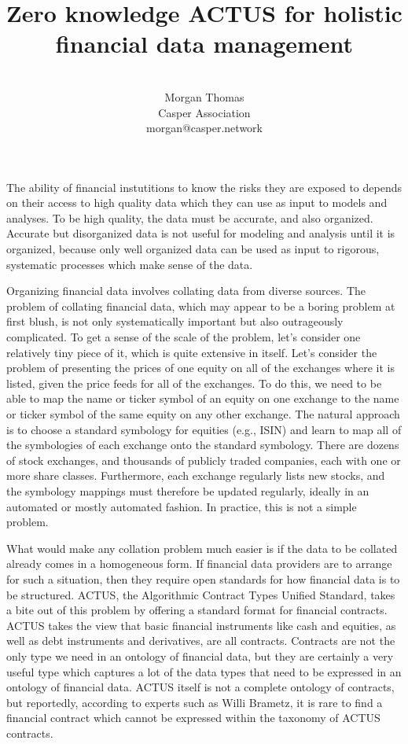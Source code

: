 \documentclass[11pt]{article}
\title{Zero knowledge ACTUS for holistic financial data management}
\author{ \\ Morgan Thomas \\ Casper Association \\ morgan@casper.network }
\begin{document}
\maketitle

The ability of financial instutitions to know the risks they are exposed to
depends on their access to high quality data which they can use as input to
models and analyses. To be high quality, the data must be accurate, and also
organized. Accurate but disorganized data is not useful for modeling and analysis
until it is organized, because only well organized data can be used as input to
rigorous, systematic processes which make sense of the data.

Organizing financial data involves collating data from diverse sources.
The problem of collating financial data, which may appear to be a boring problem
at first blush, is not only systematically important but also outrageously
complicated. To get a sense of the scale of the problem, let's consider one
relatively tiny piece of it, which is quite extensive in itself. Let's consider
the problem of presenting the prices of one equity on all of the exchanges
where it is listed, given the price feeds for all of the exchanges. To do this,
we need to be able to map the name or ticker symbol of an equity on one exchange
to the name or ticker symbol of the same equity on any other exchange. The natural
approach is to choose a standard symbology for equities (e.g., ISIN)
and learn to map all of the symbologies of each exchange onto the standard
symbology. There are dozens
of stock exchanges, and thousands of publicly traded companies, each with one
or more share classes. Furthermore, each exchange regularly lists new stocks, and
the symbology mappings must therefore be updated regularly, ideally in an automated
or mostly automated fashion. In practice, this is not a simple problem.

What would make any collation problem much easier is if the data to be collated
already comes in a homogeneous form. If financial data providers are to arrange
for such a situation, then they require open standards for how financial data is to
be structured.
ACTUS, the Algorithmic Contract Types Unified Standard, takes a bite out of this
problem by offering a standard format for financial contracts. ACTUS takes the
view that basic financial instruments like cash and equities, as well as
debt instruments and derivatives, are all contracts. Contracts are not the only
type we need in an ontology of financial data, but they are certainly a very
useful type which captures a lot of the data types that need to be expressed
in an ontology of financial data. ACTUS itself is not a complete ontology of
contracts, but reportedly, according to experts such as Willi Brametz, it is rare to find a financial
contract which cannot be expressed within the taxonomy of ACTUS contracts.
\end{document}
